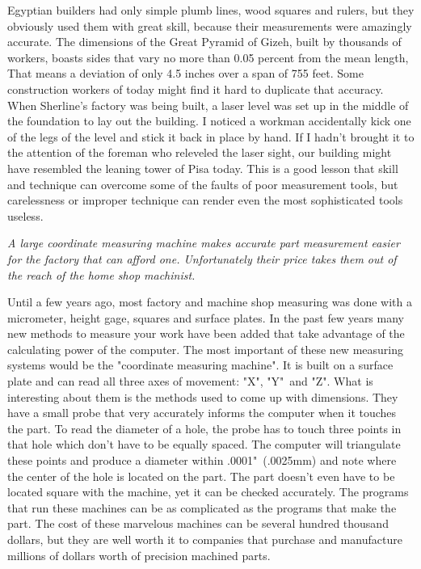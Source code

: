 Egyptian builders had only simple plumb lines, wood squares and rulers, but they
obviously used them with great skill, because their measurements were amazingly
accurate. The dimensions of the Great Pyramid of Gizeh, built by thousands of
workers, boasts sides that vary no more than 0.05 percent from the mean length,
That means a deviation of only 4.5 inches over a span of 755 feet. Some
construction workers of today might find it hard to duplicate that accuracy.
When Sherline's factory was being built, a laser level was set up in the middle
of the foundation to lay out the building. I noticed a workman accidentally kick
one of the legs of the level and stick it back in place by hand. If I hadn't
brought it to the attention of the foreman who releveled the laser sight, our
building might have resembled the leaning tower of Pisa today. This is a good
lesson that skill and technique can overcome some of the faults of poor
measurement tools, but carelessness or improper technique can render even the
most sophisticated tools useless.

\bigskip
\textit{A large coordinate measuring machine makes accurate part measurement
easier for the factory that can afford one. Unfortunately their price takes them
out of the reach of the home shop machinist.}
\bigskip


Until a few years ago, most factory and machine shop measuring was done with a
micrometer, height gage, squares and surface plates. In the past few years many
new methods to measure your work have been added that take advantage of the
calculating power of the computer. The most important of these new measuring
systems would be the "coordinate measuring machine". It is built on a surface
plate and can read all three axes of movement: "X", "Y"\ and "Z". What is
interesting about them is the methods used to come up with dimensions. They have
a small probe that very accurately informs the computer when it touches the
part. To read the diameter of a hole, the probe has to touch three points in
that hole which don't have to be equally spaced. The computer will triangulate
these points and produce a diameter within .0001"\ (.0025mm) and note where the
center of the hole is located on the part. The part doesn't even have to be
located square with the machine, yet it can be checked accurately. The programs
that run these machines can be as complicated as the programs that make the
part. The cost of these marvelous machines can be several hundred thousand
dollars, but they are well worth it to companies that purchase and manufacture
millions of dollars worth of precision machined parts.


